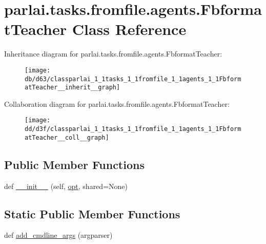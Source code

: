 \hypertarget{classparlai_1_1tasks_1_1fromfile_1_1agents_1_1FbformatTeacher}{}\section{parlai.\+tasks.\+fromfile.\+agents.\+Fbformat\+Teacher Class Reference}
\label{classparlai_1_1tasks_1_1fromfile_1_1agents_1_1FbformatTeacher}


Inheritance diagram for parlai.\+tasks.\+fromfile.\+agents.\+Fbformat\+Teacher\+:
\nopagebreak
\begin{figure}[H]
\begin{center}
\leavevmode
\texttt{[image: db/d63/classparlai\_1\_1tasks\_1\_1fromfile\_1\_1agents\_1\_1FbformatTeacher\_\_inherit\_\_graph]}
\end{center}
\end{figure}


Collaboration diagram for parlai.\+tasks.\+fromfile.\+agents.\+Fbformat\+Teacher\+:
\nopagebreak
\begin{figure}[H]
\begin{center}
\leavevmode
\texttt{[image: dd/d3f/classparlai\_1\_1tasks\_1\_1fromfile\_1\_1agents\_1\_1FbformatTeacher\_\_coll\_\_graph]}
\end{center}
\end{figure}
\subsection*{Public Member Functions}
\begin{DoxyCompactItemize}
\item 
def \hyperlink{classparlai_1_1tasks_1_1fromfile_1_1agents_1_1FbformatTeacher_a25b182854666fb92190c1d5375aba2b2}{\+\_\+\+\_\+init\+\_\+\+\_\+} (self, \hyperlink{classparlai_1_1core_1_1teachers_1_1FbDialogTeacher_af7a9ec497b9cd0292d7b8fa220da7c28}{opt}, shared=None)
\end{DoxyCompactItemize}
\subsection*{Static Public Member Functions}
\begin{DoxyCompactItemize}
\item 
def \hyperlink{classparlai_1_1tasks_1_1fromfile_1_1agents_1_1FbformatTeacher_a520aa7b0b4f3a80512f4cc8fd554eab9}{add\+\_\+cmdline\+\_\+args} (argparser)
\end{DoxyCompactItemize}
